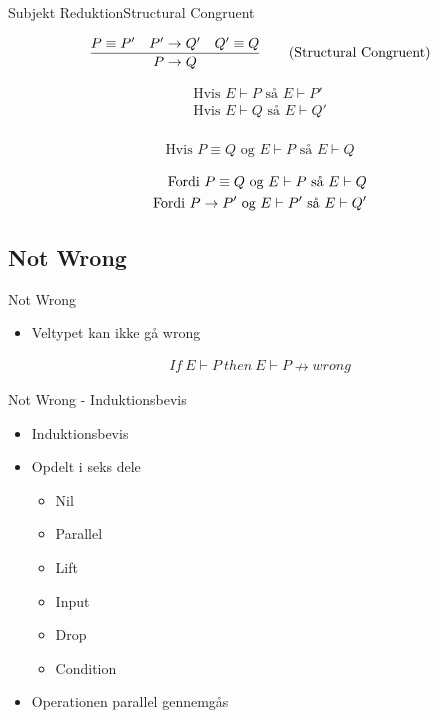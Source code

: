 \begin{frame}{Subjekt Reduktion}{Structural Congruent}

\begin{align*}
\frac{P \equiv P' \quad P' \rightarrow Q' \quad Q' \equiv Q}{P \rightarrow Q} \tag{Structural Congruent}
\end{align*}

\begin{align*}
\text{Hvis } E \vdash P \text{ så } E \vdash P'\\
\text{Hvis } E \vdash Q \text{ så } E \vdash Q'\\
\end{align*}

\begin{align*}
\tag{Lemma 2 Equivalent} \text{Hvis } P \equiv Q \text{ og } E \vdash P \text{ så } E \vdash Q
\end{align*}

\begin{align*}
\text{Fordi } P \equiv Q \text{ og } E \vdash P \text{ så } E \vdash Q\\
\text{Fordi } P \rightarrow P' \text{ og } E \vdash P' \text{ så } E \vdash Q'\\
\end{align*}
\end{frame}

\subsection{Not Wrong}

\begin{frame}{Not Wrong}

	\begin{itemize}
		\item Veltypet kan ikke gå wrong
	\end{itemize}

	\begin{align}
		If\ E \vdash P\ then\ E \vdash P \nrightarrow wrong \tag{Not Wrong}
	\end{align}

\end{frame}

\begin{frame}{Not Wrong - Induktionsbevis}

	\begin{itemize}
		\item Induktionsbevis
		\item Opdelt i seks dele
		\begin{itemize}
			\item Nil
			\item Parallel
			\item Lift
			\item Input
			\item Drop
			\item Condition
		\end{itemize}
		\item Operationen parallel gennemgås
	\end{itemize}

\end{frame}

